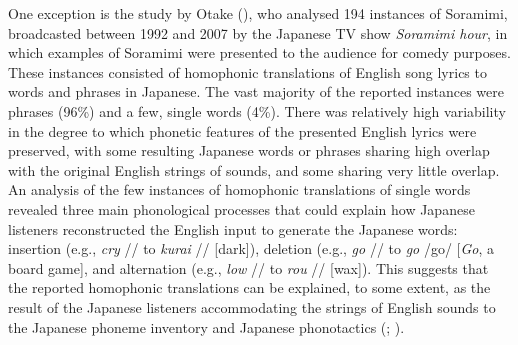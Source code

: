 \documentclass[
  man,
  longtable,
  nolmodern,
  notxfonts,
  notimes,
  colorlinks=true,linkcolor=blue,citecolor=blue,urlcolor=blue]{apa7}
\begin{document}
One exception is the study by Otake
(), who analysed 194 instances
of Soramimi, broadcasted between 1992 and 2007 by the Japanese TV show
\emph{Soramimi hour}, in which examples of Soramimi were presented to
the audience for comedy purposes. These instances consisted of
homophonic translations of English song lyrics to words and phrases in
Japanese. The vast majority of the reported instances were phrases
(96\%) and a few, single words (4\%). There was relatively high
variability in the degree to which phonetic features of the presented
English lyrics were preserved, with some resulting Japanese words or
phrases sharing high overlap with the original English strings of
sounds, and some sharing very little overlap. An analysis of the few
instances of homophonic translations of single words revealed three main
phonological processes that could explain how Japanese listeners
reconstructed the English input to generate the Japanese words:
insertion (e.g., \emph{cry} // to \emph{kurai}
// {[}dark{]}), deletion (e.g., \emph{go} //
to \emph{go} /go/ {[}\emph{Go}, a board game{]}, and alternation (e.g.,
\emph{low} // to \emph{rou} // {[}wax{]}).
This suggests that the reported homophonic translations can be
explained, to some extent, as the result of the Japanese listeners
accommodating the strings of English sounds to the Japanese phoneme
inventory and Japanese phonotactics
(;
).
\end{document}
